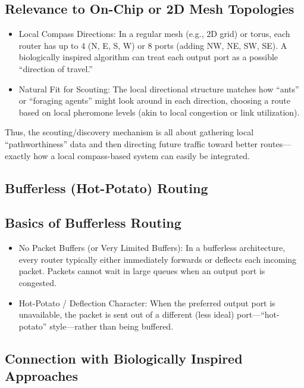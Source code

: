 \documentclass[../HFT-main.tex]{subfiles} %
\begin{document}
\subsection{Relevance to On-Chip or 2D Mesh Topologies}

 


\begin{itemize}
\item Local Compass Directions: In a regular mesh (e.g., 2D grid) or torus, each router has up to 4 (N, E, S, W) or 8 ports (adding NW, NE, SW, SE). A biologically inspired algorithm can treat each output port as a possible “direction of travel.”
\item Natural Fit for Scouting: The local directional structure matches how “ants” or “foraging agents” might look around in each direction, choosing a route based on local pheromone levels (akin to local congestion or link utilization).
\end{itemize}

Thus, the scouting/discovery mechanism is all about gathering local “pathworthiness” data and then directing future traffic toward better routes—exactly how a local compass-based system can easily be integrated.

\subsection{Bufferless (Hot-Potato) Routing}

\subsection{Basics of Bufferless Routing}

\begin{itemize}
\item No Packet Buffers (or Very Limited Buffers): In a bufferless architecture, every router typically either immediately forwards or deflects each incoming packet. Packets cannot wait in large queues when an output port is congested.
\item Hot-Potato / Deflection Character: When the preferred output port is unavailable, the packet is sent out of a different (less ideal) port—“hot-potato” style—rather than being buffered.
\end{itemize}

\subsection{Connection with Biologically Inspired Approaches}
\end{document}

